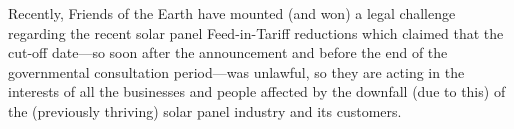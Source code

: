 \documentclass[12pt]{article}
\begin{document}
Recently, Friends of the Earth have mounted (and won) a legal challenge
regarding the recent solar panel Feed-in-Tariff reductions which claimed
that the cut-off date---so soon after the announcement and before the end
of the governmental consultation period---was unlawful, so they are acting
in the interests of all the businesses and people affected by the downfall
(due to this) of the (previously thriving) solar panel industry and its
customers.
\end{document}
